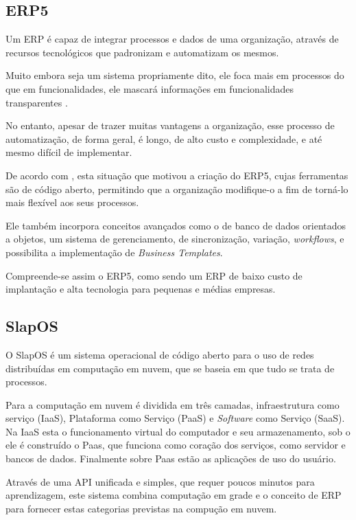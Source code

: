 \subsection{ERP5}

Um ERP é capaz de integrar processos e dados de uma organização, através de recursos tecnológicos que padronizam e automatizam os mesmos.

Muito embora seja um sistema propriamente dito, ele foca mais em processos do que em funcionalidades, ele mascará informações em funcionalidades transparentes \cite{PITRE-DESAI}.

No entanto, apesar de trazer muitas vantagens a organização, esse processo de automatização, de forma geral, é longo, de alto custo e complexidade, e até mesmo difícil de implementar.

De acordo com , esta situação que motivou a criação do ERP5, cujas ferramentas são de código aberto, permitindo que a organização modifique-o a fim de torná-lo mais flexível aos seus processos.

Ele também incorpora conceitos avançados como o de banco de dados orientados a objetos, um sistema de gerenciamento, de sincronização, variação, \textit{workflows}, e possibilita a implementação de \textit{Business Templates}.

Compreende-se assim o ERP5, como sendo um ERP de baixo custo de implantação e alta tecnologia para pequenas e médias empresas.


\subsection{SlapOS}
\label{slapos}

O SlapOS é um sistema operacional de código aberto para o uso de redes distribuídas em computação em nuvem, que se baseia em que tudo se trata de processos.

Para  a computação em nuvem é dividida em três camadas, infraestrutura como serviço (IaaS), Plataforma como Serviço (PaaS) e \textit{Software} como Serviço (SaaS). Na IaaS esta o funcionamento virtual do computador e seu armazenamento, sob o ele é construído o Paas, que funciona como coração dos serviços, como servidor e bancos de dados. Finalmente sobre Paas estão as aplicações de uso do usuário.

Através de uma API unificada e simples, que requer poucos minutos para aprendizagem, este sistema combina computação em grade e o conceito de ERP para fornecer estas categorias previstas na compução em nuvem.

